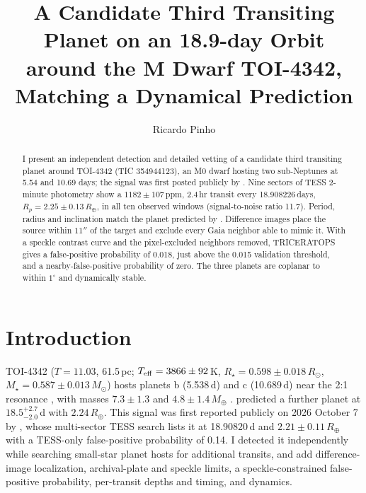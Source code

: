 \documentclass{aastex701}
\begin{document}
\title{A Candidate Third Transiting Planet on an 18.9-day Orbit around the M Dwarf TOI-4342, Matching a Dynamical Prediction}

\author[orcid=0009-0006-2744-2599,gname=Ricardo,sname=Pinho]{Ricardo Pinho}

\begin{abstract}
I present an independent detection and detailed vetting of a candidate third transiting planet around TOI-4342 (TIC 354944123), an M0 dwarf hosting two sub-Neptunes at 5.54 and 10.69 days; the signal was first posted publicly by \citet{Eumemic2026}. Nine sectors of TESS 2-minute photometry show a $1182\pm107$\,ppm, 2.4\,hr transit every 18.908226\,days, $R_p=2.25\pm0.13\,R_\oplus$, in all ten observed windows (signal-to-noise ratio 11.7). Period, radius and inclination match the planet predicted by \citet{2025AJ....170....3T}. Difference images place the source within $11''$ of the target and exclude every Gaia neighbor able to mimic it. With a speckle contrast curve and the pixel-excluded neighbors removed, TRICERATOPS gives a false-positive probability of 0.018, just above the 0.015 validation threshold, and a nearby-false-positive probability of zero. The three planets are coplanar to within $1^\circ$ and dynamically stable.
\end{abstract}


\section{Introduction}

TOI-4342 ($T=11.03$, 61.5\,pc; $T_{\rm eff}=3866\pm92$\,K, $R_\star=0.598\pm0.018\,R_\odot$, $M_\star=0.587\pm0.013\,M_\odot$) hosts planets b (5.538\,d) and c (10.689\,d) near the 2:1 resonance \citep{2023AJ....165...93T}, with masses $7.3\pm1.3$ and $4.8\pm1.4\,M_\oplus$ \citep{2026A&A...708A..81P}. \citet{2025AJ....170....3T} predicted a further planet at $18.5^{+2.7}_{-2.0}$\,d with $2.24\,R_\oplus$. This signal was first reported publicly on 2026 October 7 by \citet{Eumemic2026}, whose multi-sector TESS search lists it at 18.90820\,d and $2.21\pm0.11\,R_\oplus$ with a TESS-only false-positive probability of 0.14. I detected it independently while searching small-star planet hosts for additional transits, and add difference-image localization, archival-plate and speckle limits, a speckle-constrained false-positive probability, per-transit depths and timing, and dynamics.
\end{document}
